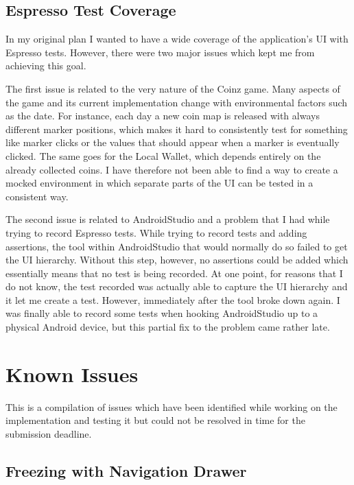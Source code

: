 \documentclass[11pt,a4paper,notitlepage]{article}
\begin{document}
\subsection{Espresso Test Coverage}

    In my original plan I wanted to have a wide coverage of the application's UI with Espresso tests. However, there were two major issues which kept me from achieving this goal.

    The first issue is related to the very nature of the Coinz game. Many aspects of the game and its current implementation change with environmental factors such as the date. For instance, each day a new coin map is released with always different marker positions, which makes it hard to consistently test for something like marker clicks or the values that should appear when a marker is eventually clicked. The same goes for the Local Wallet, which depends entirely on the already collected coins. I have therefore not been able to find a way to create a mocked environment in which separate parts of the UI can be tested in a consistent way.

    The second issue is related to AndroidStudio and a problem that I had while trying to record Espresso tests. \cite{espresso-issue} While trying to record tests and adding assertions, the tool within AndroidStudio that would normally do so failed to get the UI hierarchy. Without this step, however, no assertions could be added which essentially means that no test is being recorded. At one point, for reasons that I do not know, the test recorded was actually able to capture the UI hierarchy and it let me create a test. However, immediately after the tool broke down again. I was finally able to record some tests when hooking AndroidStudio up to a physical Android device, but this partial fix to the problem came rather late.

\section{Known Issues}

    This is a compilation of issues which have been identified while working on the implementation and testing it but could not be resolved in time for the submission deadline.

\subsection{Freezing with Navigation Drawer}
\end{document}
